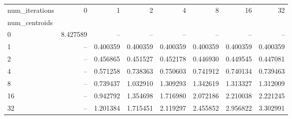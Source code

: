 \begin{tabular}{lrrrrrrr}
\toprule
num\_iterations &        0  &        1  &        2  &        4  &        8  &        16 &        32 \\
num\_centroids &           &           &           &           &           &           &           \\
\midrule
0             &  8.427589 &       -- &       -- &       -- &       -- &       -- &       -- \\
1             &       -- &  0.400359 &  0.400359 &  0.400359 &  0.400359 &  0.400359 &  0.400359 \\
2             &       -- &  0.456865 &  0.451527 &  0.452178 &  0.446930 &  0.449545 &  0.447081 \\
4             &       -- &  0.571258 &  0.738363 &  0.750603 &  0.741912 &  0.740134 &  0.739463 \\
8             &       -- &  0.739437 &  1.032910 &  1.309293 &  1.342619 &  1.313327 &  1.312009 \\
16            &       -- &  0.942792 &  1.354698 &  1.716980 &  2.072186 &  2.210038 &  2.221245 \\
32            &       -- &  1.201384 &  1.715451 &  2.119297 &  2.455852 &  2.956822 &  3.302991 \\
\bottomrule
\end{tabular}
